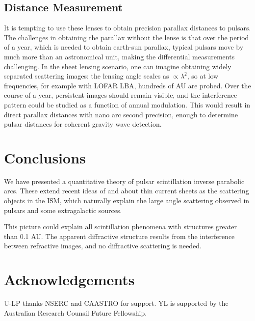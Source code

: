 \documentclass[useAMS,usenatbib]{mn2e}
\begin{document}
\subsection{Distance Measurement}

It is tempting to use these lenses to obtain precision parallax
distances to pulsars.  The challenges in obtaining the parallax without the lense
 is that over the
period of a year, which is needed to obtain earth-sun parallax,
typical pulsars move by much more than an astronomical unit, making
the differential measurements challenging.  In the sheet lensing
scenario, one can imagine obtaining widely separated scattering images:
the lensing angle scales as $\propto \lambda^2$, so at low
frequencies, for example with LOFAR LBA, hundreds of AU are probed.
Over the course of a year, persistent images should remain visible, and the
interference pattern could be studied as a function of annual
modulation.  This would result in direct parallax distances with nano arc
second precision, enough to determine pulsar distances for coherent
gravity wave detection.

\section{Conclusions}

We have presented a quantitative theory of pulsar scintillation
inverse parabolic arcs.  These extend recent ideas of
\citet{2006ApJ...640L.159G} and \citet{2012MNRAS.421L.132P} about thin
current sheets as the scattering objects in the ISM, which naturally
explain the large angle scattering observed in pulsars and some
extragalactic sources.

This picture could explain all scintillation phenomena with structures
greater than 0.1 AU.  The apparent diffractive structure results from
the interference between refractive images, and no diffractive
scattering is needed.

\section{Acknowledgements}

U-LP thanks NSERC and CAASTRO for support. YL is supported 
by the Australian Research Counsil Future Fellowship.
\end{document}
